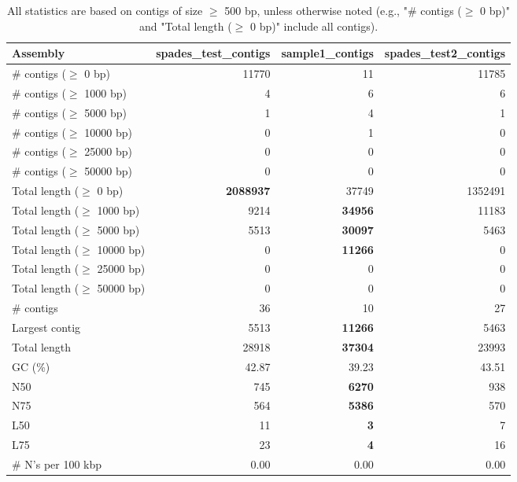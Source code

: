 \documentclass[12pt,a4paper]{article}
\begin{document}
\begin{table}[ht]
\begin{center}
\caption{All statistics are based on contigs of size $\geq$ 500 bp, unless otherwise noted (e.g., "\# contigs ($\geq$ 0 bp)" and "Total length ($\geq$ 0 bp)" include all contigs).}
\begin{tabular}{|l*{3}{|r}|}
\hline
Assembly & spades\_test\_contigs & sample1\_contigs & spades\_test2\_contigs \\ \hline
\# contigs ($\geq$ 0 bp) & 11770 & 11 & 11785 \\ \hline
\# contigs ($\geq$ 1000 bp) & 4 & 6 & 6 \\ \hline
\# contigs ($\geq$ 5000 bp) & 1 & 4 & 1 \\ \hline
\# contigs ($\geq$ 10000 bp) & 0 & 1 & 0 \\ \hline
\# contigs ($\geq$ 25000 bp) & 0 & 0 & 0 \\ \hline
\# contigs ($\geq$ 50000 bp) & 0 & 0 & 0 \\ \hline
Total length ($\geq$ 0 bp) & {\bf 2088937} & 37749 & 1352491 \\ \hline
Total length ($\geq$ 1000 bp) & 9214 & {\bf 34956} & 11183 \\ \hline
Total length ($\geq$ 5000 bp) & 5513 & {\bf 30097} & 5463 \\ \hline
Total length ($\geq$ 10000 bp) & 0 & {\bf 11266} & 0 \\ \hline
Total length ($\geq$ 25000 bp) & 0 & 0 & 0 \\ \hline
Total length ($\geq$ 50000 bp) & 0 & 0 & 0 \\ \hline
\# contigs & 36 & 10 & 27 \\ \hline
Largest contig & 5513 & {\bf 11266} & 5463 \\ \hline
Total length & 28918 & {\bf 37304} & 23993 \\ \hline
GC (\%) & 42.87 & 39.23 & 43.51 \\ \hline
N50 & 745 & {\bf 6270} & 938 \\ \hline
N75 & 564 & {\bf 5386} & 570 \\ \hline
L50 & 11 & {\bf 3} & 7 \\ \hline
L75 & 23 & {\bf 4} & 16 \\ \hline
\# N's per 100 kbp & 0.00 & 0.00 & 0.00 \\ \hline
\end{tabular}
\end{center}
\end{table}
\end{document}
